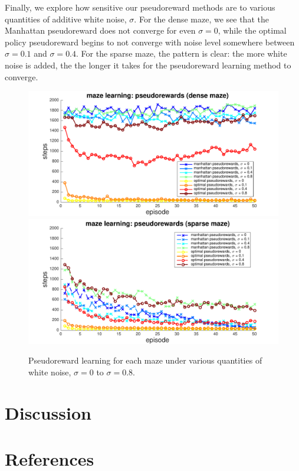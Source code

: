 \documentclass[notitlepage]{article}
\begin{document}
Finally, we explore how sensitive our pseudoreward methods are to various quantities of additive white noise, $\sigma$. For the dense maze, we see that the Manhattan pseudoreward does not converge for even $\sigma = 0$, while the optimal policy pseudoreward begins to not converge with noise level somewhere between $\sigma = 0.1$ and $\sigma = 0.4$. For the sparse maze, the pattern is clear: the more white noise is added, the the longer it takes for the pseudoreward learning method to converge.

\begin{figure}[ht]
\includegraphics[width=\textwidth]{PRdenseCompare}
\includegraphics[width=\textwidth]{PRsparseCompare}
\caption{Pseudoreward learning for each maze under various quantities of white noise, $\sigma = 0$ to $\sigma = 0.8$.}
\label{fig:sigma-compare}
\end{figure}

\section*{Discussion}

\section*{References}

{}

\end{document}
